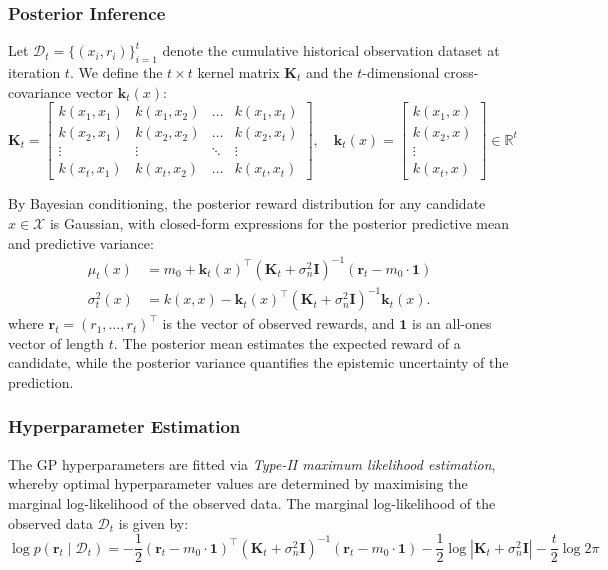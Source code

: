 \subsubsection{Posterior Inference}
Let $\mathcal{D}_t = \{(x_i, r_i)\}_{i=1}^{t}$ denote the cumulative historical observation dataset at iteration $t$. We define the $t \times t$ kernel matrix $\mathbf{K}_t$ and the $t$-dimensional cross-covariance vector $\mathbf{k}_t(x)$:
\[
\mathbf{K}_t =
\begin{bmatrix}
k(x_1, x_1) & k(x_1, x_2) & \dots & k(x_1, x_t) \\
k(x_2, x_1) & k(x_2, x_2) & \dots & k(x_2, x_t) \\
\vdots      & \vdots      & \ddots & \vdots      \\
k(x_t, x_1) & k(x_t, x_2) & \dots & k(x_t, x_t)
\end{bmatrix},\quad
\mathbf{k}_t(x) =
\begin{bmatrix}
k(x_1, x) \\
k(x_2, x) \\
\vdots \\
k(x_t, x)
\end{bmatrix} \in \mathbb{R}^t
\]

By Bayesian conditioning, the posterior reward distribution for any candidate $x \in \mathcal{X}$ is Gaussian, with closed-form expressions for the posterior predictive mean and predictive variance:
\begin{align}
\mu_t(x) &= m_0 + \mathbf{k}_t(x)^\top \left(\mathbf{K}_t + \sigma_n^2 \mathbf{I}\right)^{-1} \left(\mathbf{r}_t - m_0 \cdot \mathbf{1}\right) \label{eq:postmean} \\
\sigma_t^2(x) &= k(x, x) - \mathbf{k}_t(x)^\top \left(\mathbf{K}_t + \sigma_n^2 \mathbf{I}\right)^{-1} \mathbf{k}_t(x). \label{eq:postvar}
\end{align}
where $\mathbf{r}_t = (r_1, \dots, r_t)^\top$ is the vector of observed rewards, and $\mathbf{1}$ is an all-ones vector of length $t$. The posterior mean estimates the expected reward of a candidate, while the posterior variance quantifies the epistemic uncertainty of the prediction.

\subsubsection{Hyperparameter Estimation}
The GP hyperparameters are fitted via \emph{Type-II maximum likelihood estimation}, whereby optimal hyperparameter values are determined by maximising the marginal log-likelihood of the observed data. The marginal log-likelihood of the observed data $\mathcal{D}_t$ is given by:
\[
\log p(\mathbf{r}_t \mid \mathcal{D}_t) = -\frac{1}{2} (\mathbf{r}_t - m_0 \cdot \mathbf{1})^\top \left(\mathbf{K}_t + \sigma_n^2 \mathbf{I}\right)^{-1} (\mathbf{r}_t - m_0 \cdot \mathbf{1}) - \frac{1}{2}\log\left|\mathbf{K}_t + \sigma_n^2 \mathbf{I}\right| - \frac{t}{2}\log 2\pi
\]

